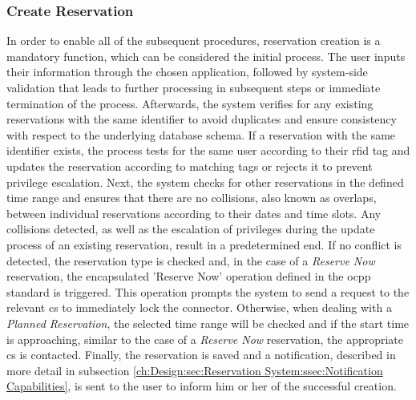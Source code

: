 \subsubsection{Create Reservation}
\label{ch:Design:sec:Reservation System:ssec:Management Capabilities:sssec:Create Reservation}

In order to enable all of the subsequent procedures, reservation creation is a mandatory function, which can be considered the initial process. The user inputs their information through the chosen application, followed by system-side validation that leads to further processing in subsequent steps or immediate termination of the process.
Afterwards, the system verifies for any existing reservations with the same identifier to avoid duplicates and ensure consistency with respect to the underlying database schema. If a reservation with the same identifier exists, the process tests for the same user according to their \acrshort{rfid} tag and updates the reservation according to matching tags or rejects it to prevent privilege escalation.
Next, the system checks for other reservations in the defined time range and ensures that there are no collisions, also known as overlaps, between individual reservations according to their dates and time slots.
Any collisions detected, as well as the escalation of privileges during the update process of an existing reservation, result in a predetermined end.
If no conflict is detected, the reservation type is checked and, in the case of a \textit{Reserve Now} reservation, the encapsulated 'Reserve Now' operation defined in the \acrshort{ocpp} standard \cite{noauthor_ocpp_nodate} is triggered. This operation prompts the system to send a request to the relevant \acrshort{cs} to immediately lock the connector. 
Otherwise, when dealing with a \textit{Planned Reservation}, the selected time range will be checked and if the start time is approaching, similar to the case of a \textit{Reserve Now} reservation, the appropriate \acrshort{cs} is contacted.
Finally, the reservation is saved and a notification, described in more detail in subsection \ref{ch:Design:sec:Reservation System:ssec:Notification Capabilities}, is sent to the user to inform him or her of the successful creation.

